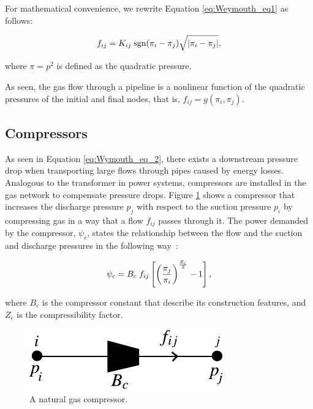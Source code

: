 For mathematical convenience, we rewrite Equation \ref{eq:Weymouth_eq1} as follows:

\begin{equation}
	\label{eq:Wymouth_eq_2}
	f_{ij} = K_{ij} \;\text{sgn}(\pi_i - \pi_j)\sqrt{|\pi_i-\pi_j|},
	\vspace{0.3cm}
\end{equation}

\noindent where $\pi=p^2$ is defined as the quadratic pressure. 

As seen, the gas flow through a pipeline is a nonlinear function of the quadratic pressures of the initial and final nodes, that is, $f_{ij}=g(\pi_i,\pi_j)$. 

\subsection{Compressors}
\label{subsec:compressors}
As seen in Equation \ref{eq:Wymouth_eq_2}, there exists a downstream pressure drop when transporting large flows through pipes caused by energy losses. Analogous to the transformer in power systems, compressors are installed in the gas network to compensate pressure drops. Figure \ref{fig:compressor} shows a compressor that increases the discharge pressure $p_j$ with respect to the suction pressure $p_i$ by compressing gas in a way that a flow $f_{ij}$ passes through it. The power demanded by the compressor, $\psi_c$, states the relationship between the flow and the suction and discharge pressures in the following way~\cite{Shabanpour2016}:

\begin{equation}
	\label{eq:power_comp}
	\psi_c = B_c\; f_{ij} \left[\left(\frac{\pi_j}{\pi_i}\right)^{\frac{Z_c}{2}}-1\right],
	\vspace{0.3cm}
\end{equation}

where $B_c$ is the compressor constant that describe its construction features, and $Z_c$ is the compressibility factor.

\begin{figure}[!ht]
	\centering
	\includegraphics[scale=0.9]{Figures/Compressor}
	\caption{A natural gas compressor.}	
	\label{fig:compressor}
\end{figure}

